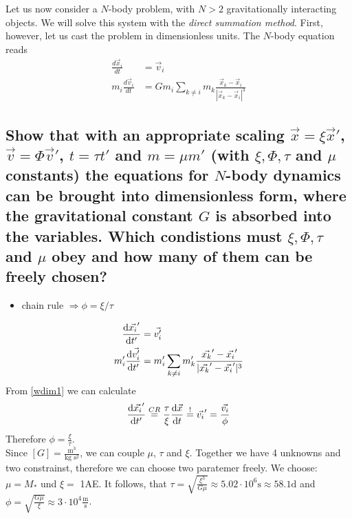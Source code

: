 Let us now consider a $N$-body problem, with $N>2$ gravitationally interacting
objects. We will solve this system with the \textit{direct summation method}.
First, however, let us cast the problem in dimensionless units. The $N$-body
equation reads
\begin{align}
    \frac{d\vec{x}_i}{dt}
    &=\vec{v}_i \\
    m_i\frac{d\vec{v}_i}{dt}
    &=Gm_i\sum_{k\neq i}m_k\frac{\vec{x}_k-\vec{x}_i}{|\vec{x}_k-\vec{x}_i|^3}
\end{align}

\subsection{Show that with an appropriate scaling $\vec x=\xi\vec x'$,
    $\vec v=\Phi\vec v'$, $t=\tau t'$ and $m=\mu m'$ (with $\xi,\Phi,\tau$
    and $\mu$ constants) the equations for $N$-body dynamics can be brought 
    into dimensionless form, where the gravitational constant $G$ is absorbed
    into the variables. Which condistions must $\xi,\Phi,\tau$ and $\mu$ obey
    and how many of them can be freely chosen?
}
    \begin{itemize}
        \item chain rule $\Rightarrow\phi=\xi/\tau$
    \end{itemize}
    \begin{align}
        \frac{\mathrm{d} \vec{x_i}'}{\mathrm{d} t'}
        &= \vec{v_i'} \label{wdim1}\\
        m_i' \frac{\mathrm{d} \vec{v_i'}}{\mathrm{d} t'}
        &= m_i' \sum_{k\neq i} m_k'
        \frac{\vec{x_k}' -\vec{x_i}'}{|\vec{x_k}'-\vec{x_i}'|^3}
 		\label{wdim2}   
    \end{align}
    From \ref{wdim1} we can calculate 
   \begin{equation}
   		\frac{\mathrm{d} \vec{x_i}'}{\mathrm{d} t'} \overset{CR}{=} \frac{\tau}{\xi} \frac{\mathrm{d} \vec{x}}{\mathrm{d} t} \overset{!}{=} \vec{v_i}' = \frac{\vec{v_i}}{\phi}  
   \end{equation}
   Therefore $ \phi = \frac{\xi}{\tau}$.\\
    Since $[G] = \frac{\text{m}^3}{\text{kg } \text{s}^2}$, we can couple $\mu$, $\tau$ and  $\xi$. 
   Together we have 4 unknowns and two constrainst, therefore we can choose two paratemer freely.
   We choose: $ \mu = M_*$ und $ \xi=$ 1AE. It follows, that $ \tau = \sqrt{\frac{\xi^3}{G \mu}} \approx 5.02\cdot 10^6\text{s} \approx 58.1 \text{d} $ and $ \phi = \sqrt{\frac{G \mu}{\xi}} \approx3\cdot 10^4\frac{\text{m}}{\text{s}}$.
   
